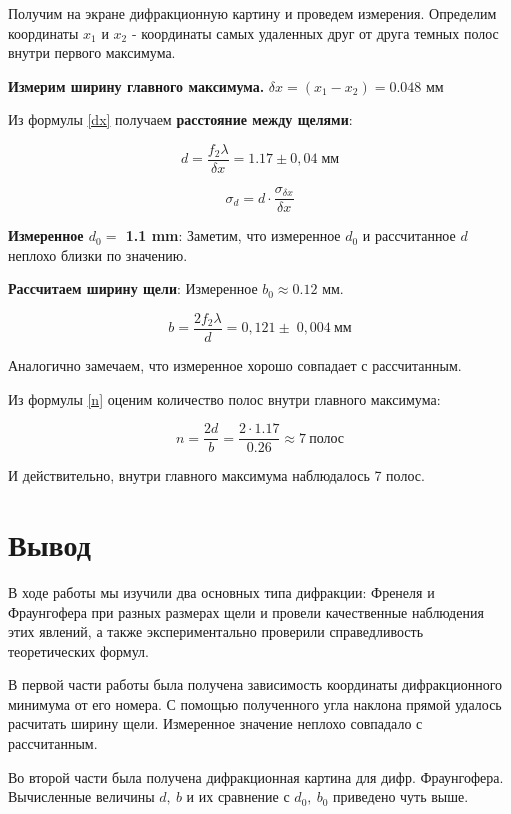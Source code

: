 \documentclass[15pt,a5paper,reqno]{article}
\begin{document}
Получим на экране дифракционную картину и проведем измерения. Определим координаты $x_1$ и $x_2$ - координаты самых удаленных друг от друга темных полос внутри первого максимума.



 \textbf{Измерим ширину главного максимума.}
 \newline
 $  \delta x  = (x_{1} - x_{2} )= 0.048 $ мм

 Из формулы \eqref{dx} получаем \textbf{расстояние между щелями}:
 
 \[d = \dfrac{f_2 \lambda}{\delta x} = 1.17 \pm 0,04 \; \text{мм}\]
 
 \[ \sigma_d = d\cdot \frac{\sigma_{\delta x}}{\delta x}       \]
 
 \textbf{Измеренное $d_0 = $ 1.1 mm}:
\newline
 Заметим, что измеренное $d_0$ и рассчитанное $d$ неплохо близки по значению.
 
\textbf{Рассчитаем ширину щели}:
\newline
Измеренное $b_0 \approx 0.12$ \: мм.
 
 \begin{equation}\label{}
 b = \dfrac{2 f_2 \lambda}{d} = 0,121 \pm \;0,004 \: \text{мм}
 \end{equation}
 
 Аналогично замечаем, что измеренное хорошо совпадает с рассчитанным.
 
 Из формулы \eqref{n} оценим количество полос внутри главного максимума:
 
 \[ n = \frac{2d}{b} = \frac{2 \cdot 1.17}{0.26}  \approx 7 \: \text{полос}   \] 
 
И действительно, внутри главного максимума наблюдалось 7 полос.
 
 \section{Вывод}
 
 В ходе работы мы изучили два основных типа дифракции: Френеля и Фраунгофера при разных размерах щели и провели качественные наблюдения этих явлений, а также экспериментально проверили справедливость теоретических формул.  
 
 В первой части работы была получена зависимость координаты дифракционного минимума от его номера. 
 С помощью полученного угла наклона прямой удалось расчитать ширину щели. Измеренное значение неплохо совпадало с рассчитанным.
 
Во второй части была получена дифракционная картина для дифр. Фраунгофера. Вычисленные величины $d, \: b$ и их сравнение с $d_0, \: b_0$ приведено чуть выше.
\end{document}
